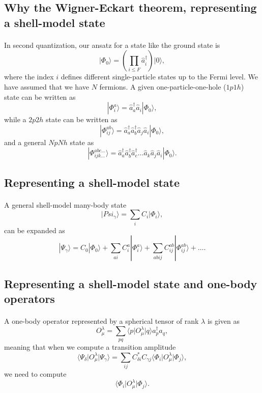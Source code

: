 \documentclass[%
oneside,                 %
final,                   %
10pt]{article}
\begin{document}
\subsection{Why the Wigner-Eckart theorem, representing a shell-model state}

\paragraph{}
In second quantization, our ansatz for a state like the ground state is
\[
\vert \Phi_0\rangle = \left(\prod_{i\le F}\hat{a}_{i}^{\dagger}\right)|0\rangle,
\]
where the index $i$ defines different single-particle states up to the Fermi level. We have assumed that we have $N$ fermions.
A given one-particle-one-hole ($1p1h$) state can be written as
\[
|\Phi_i^a\rangle = \hat{a}_{a}^{\dagger}\hat{a}_i|\Phi_0\rangle,
\]
while a $2p2h$ state can be written as
\[
|\Phi_{ij}^{ab}\rangle = \hat{a}_{a}^{\dagger}\hat{a}_{b}^{\dagger}\hat{a}_j\hat{a}_i|\Phi_0\rangle,
\]
and a general $NpNh$ state as
\[
|\Phi_{ijk\dots}^{abc\dots}\rangle = \hat{a}_{a}^{\dagger}\hat{a}_{b}^{\dagger}\hat{a}_{c}^{\dagger}\dots\hat{a}_k\hat{a}_j\hat{a}_i|\Phi_0\rangle.
\]



\subsection{Representing a shell-model state}

\paragraph{}
A general shell-model many-body state 
\[
\vert Psi_{\gamma}\rangle = \sum_{i} C_i \vert \Phi_i\rangle,
\]
can be expanded as 
\[
|\Psi_{\gamma}\rangle=C_0|\Phi_0\rangle+\sum_{ai}C_i^a|\Phi_i^a\rangle+\sum_{abij}C_{ij}^{ab}|\Phi_{ij}^{ab}\rangle+\dots. 
\]


\subsection{Representing a shell-model state and one-body operators}

\paragraph{}
A one-body operator represented by a spherical tensor of rank $\lambda$ is given as 
\[
O_{\mu}^{\lambda} = \sum_{pq} \langle p \vert O_{\mu}^{\lambda} \vert q \rangle a^{\dagger}_pa_q,
\]
meaning that when we compute a transition amplitude 
\[
\langle \Psi_{\delta} \vert   O_{\mu}^{\lambda}  \vert \Psi_{\gamma} \rangle = \sum_{ij} C^{*}_{\delta i} C_{\gamma j}  \langle \Phi_i \vert O_{\mu}^{\lambda} \vert \Phi_j\rangle,
\]
we need to compute 
\[
\langle \Phi_i \vert O_{\mu}^{\lambda} \vert \Phi_j\rangle.
\]
\end{document}
